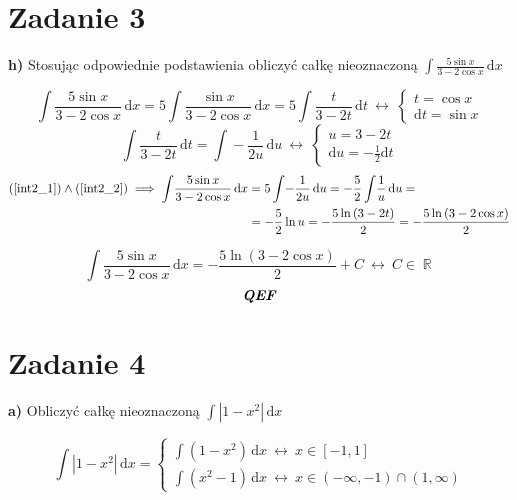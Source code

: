 \documentclass[12pt]{article}
\newcommand{\ex}[1]{\textbf{ #1)}}
\newcommand{\for}{\ \leftrightarrow\ }
\newcommand{\Integral}[2]{\int \! #1 \, \mathrm{d}#2}
\newcommand{\qef}{\textbf{\textit{QEF}}}
\newcommand{\task}[1]{\section*{Zadanie #1}}
\let\oldref\ref
\renewcommand{\ref}[1]{(\oldref{#1})}
\DeclareMathOperator{\R}{\mathbb{R}}
\begin{document}
\newpage

\setcounter{equation}{0}
\task{3}\ex{h}
Stosując odpowiednie podstawienia obliczyć całkę nieoznaczoną
$ \displaystyle \Integral{\frac{5 \sin{x}}{3 - 2 \cos{x}}}{x} $

\begin{equation} \label{int2_1}
    \Integral{\frac{5 \sin{x}}{3 - 2 \cos{x}}}{x} =
    5 \Integral{\frac{\sin{x}}{3 - 2 \cos{x}}}{x} =
    5 \Integral{\frac{t}{3-2t}}{t} \for
    \left\{ \begin{array}{l}
        t = \cos{x} \\
        \mathrm{d}t = \sin{x}
    \end{array} \right.
\end{equation}
\begin{equation} \label{int2_2}
    \Integral{\frac{t}{3-2t}}{t} = \Integral{-\frac{1}{2u}}{u} \for
    \left\{ \begin{array}{l}
        u = 3 - 2t\\
        \mathrm{d}u = -\frac{1}{2}{\mathrm{d}t}
    \end{array} \right.
\end{equation}
\begin{equation*}
    \begin{aligned}
        \ref{int2_1} \land \ref{int2_2} \implies
        \Integral{\frac{5 \sin{x}}{3 - 2 \cos{x}}}{x} &= 5\Integral{-\frac{1}{2u}}{u} =
         -\frac{5}{2} \Integral{\frac{1}{u}}{u} = \\
         & = -\frac{5}{2} \ln{u} =
         -\frac{5\ln{(3-2t)}}{2} =
         -\frac{5\ln{(3-2 \cos{x})}}{2}
    \end{aligned}
\end{equation*}

$$ \Integral{\frac{5 \sin{x}}{3 - 2 \cos{x}}}{x} = -\frac{5\ln{(3-2 \cos{x})}}{2} + C \for C \in \R $$
$$ \qef $$

\setcounter{equation}{0}
\task{4}\ex{a}
Obliczyć całkę nieoznaczoną $ \displaystyle \Integral{\left| 1-x^2 \right|}{x} $

\begin{equation} \label{int3_1}
    \Integral{\left| 1-x^2 \right|}{x} =
    \left\{ \begin{array}{l}
        \displaystyle \Integral{(1 - x^2)}{x} \for x \in [-1,1] \\
        \displaystyle \Integral{(x^2 - 1)}{x} \for x \in (-\infty,-1)\cap(1,\infty)
    \end{array} \right.
\end{equation}
\end{document}
